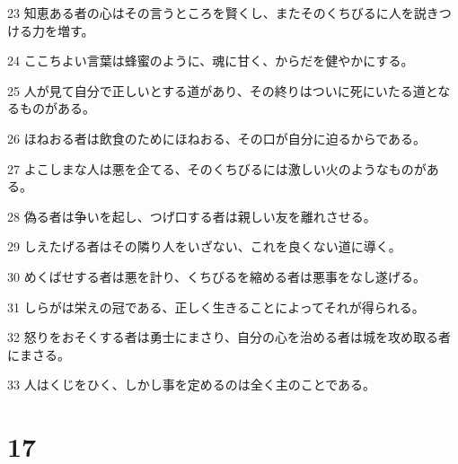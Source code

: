 \par 23 知恵ある者の心はその言うところを賢くし、またそのくちびるに人を説きつける力を増す。
\par 24 ここちよい言葉は蜂蜜のように、魂に甘く、からだを健やかにする。
\par 25 人が見て自分で正しいとする道があり、その終りはついに死にいたる道となるものがある。
\par 26 ほねおる者は飲食のためにほねおる、その口が自分に迫るからである。
\par 27 よこしまな人は悪を企てる、そのくちびるには激しい火のようなものがある。
\par 28 偽る者は争いを起し、つげ口する者は親しい友を離れさせる。
\par 29 しえたげる者はその隣り人をいざない、これを良くない道に導く。
\par 30 めくばせする者は悪を計り、くちびるを縮める者は悪事をなし遂げる。
\par 31 しらがは栄えの冠である、正しく生きることによってそれが得られる。
\par 32 怒りをおそくする者は勇士にまさり、自分の心を治める者は城を攻め取る者にまさる。
\par 33 人はくじをひく、しかし事を定めるのは全く主のことである。

\chapter{17}

